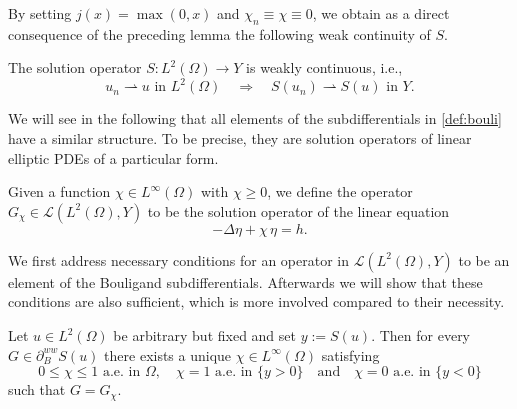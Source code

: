 \documentclass[reqno]{shinyart}
\begin{document}
By setting $j(x) = \max(0, x)$ and $\chi_n \equiv \chi \equiv 0$, we obtain 
as a direct consequence of the preceding lemma the following weak continuity of $S$.
\begin{corollary}\label{cor:Vollstetig}
    The solution operator $S : L^2(\Omega) \to Y$ is weakly continuous, i.e., 
    \begin{equation*}
        u_n {\rightharpoonup} u \text{ in }L^2(\Omega) \quad \Longrightarrow \quad  
        S(u_n) {\rightharpoonup} S(u) \text{ in } Y.
    \end{equation*}
\end{corollary}

We will see in the following that all elements of the subdifferentials in 
\cref{def:bouli} have a similar structure. To be precise, they are solution operators of linear 
elliptic PDEs of a particular form. 
\begin{definition}\label{def:Gchi}
    Given a function $\chi \in L^\infty(\Omega)$ with $\chi \geq 0$, we define 
    the operator $G_\chi \in {\mathcal{L}}(L^2(\Omega), Y)$ to be the solution operator of the 
    linear equation 
    \begin{equation}\label{eq:linpdechi}
        -\Delta \eta +\chi\, \eta = h.
    \end{equation}  
\end{definition}

We first address necessary conditions for an operator in ${\mathcal{L}}(L^2(\Omega),Y)$ to be an element of 
the Bouligand subdifferentials. Afterwards we will show that these conditions are also sufficient, 
which is more involved compared to their necessity.
\begin{proposition}\label{prop:necessaryweak}
    Let $u \in L^2(\Omega)$ be arbitrary but fixed and set $y:=S(u)$. 
    Then for every $G \in  \partial_{B}^{ww} S(u)$ there exists a unique $\chi \in L^\infty(\Omega)$
    satisfying
    \begin{equation}\label{eq:chiweakstar}
        0 \leq \chi \leq 1 \text{ a.e.\ in }\Omega, \quad \chi = 1 \text{ a.e.\ in } \{y > 0\}
        \quad \text{and} \quad \chi = 0 \text{ a.e.\ in } \{y < 0\}
    \end{equation}
    such that $G = G_\chi$.
\end{proposition}
\end{document}
